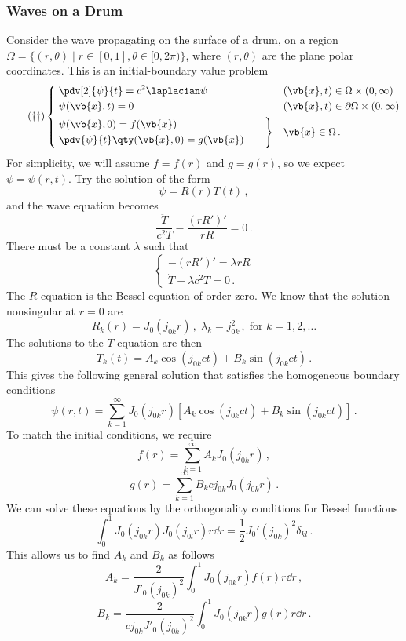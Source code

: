 \documentclass{article}
\theoremstyle{plain}\theoremheaderfont{\normalfont\itshape}\theorembodyfont{\rmfamily}\theoremseparator{.}\newtheorem*{rem}{Remark}\newtheorem*{ex}{Example}\newtheorem*{proof}{Proof}\newtheorem*{altp}{Alternative proof}
\theoremstyle{plain}\theoremheaderfont{\normalfont\bfseries}\theorembodyfont{\rmfamily}\theoremseparator{.}\newtheorem{thm}{Theorem}[section]\newtheorem{lem}[thm]{Lemma}\newtheorem{prop}[thm]{Proposition}\newtheorem*{cor}{Corollary}\newtheorem{defn}[thm]{Definition}\newtheorem{clm}[thm]{Claim}\newtheorem{clminproof}{Claim}
\theoremstyle{break}\theoremheaderfont{\normalfont\itshape}\theorembodyfont{\rmfamily}\theoremseparator{.\medskip}\newtheorem*{proofskip}{Proof}\newtheorem*{exs}{Examples}\newtheorem*{rems}{Remarks}
\theoremstyle{break}\theoremheaderfont{\normalfont\bfseries}\theorembodyfont{\rmfamily}\theoremseparator{.\medskip}\newtheorem{lemskip}[thm]{Lemma}\newtheorem{defnskip}[thm]{Definition}\newtheorem{propskip}[thm]{Proposition}\newtheorem{thmskip}[thm]{Theorem}
\numberwithin{equation}{section}
\begin{document}
	\subsubsection{Waves on a Drum}
	Consider the wave propagating on the surface of a drum, on a region \(\Omega=\{(r,\theta)\mid r\in[0,1],\theta\in[0,2\pi)\}\), where \((r,\theta)\) are the plane polar coordinates. This is an initial-boundary value problem
	\begin{equation}\tag{\(\dagger\dagger\)}
		\left\{\begin{aligned}
			& \;\pdv[2]{\psi}{t}=c^2\laplacian \psi && (\vb{x},t)\in\Omega\times(0,\infty)\\
			& \;\psi(\vb{x},t)=0 && (\vb{x},t)\in\partial\Omega\times(0,\infty)\\
			& \left.\begin{aligned}
				& \psi(\vb{x},0)=f(\vb{x})\\
				& \pdv{\psi}{t}\qty(\vb{x},0)=g(\vb{x})
			\end{aligned}\qquad\right\} && \vb{x}\in\Omega\,.
		\end{aligned}\right.
	\end{equation}
	For simplicity, we will assume \(f=f(r)\) and \(g=g(r)\), so we expect \(\psi=\psi(r,t)\). Try the solution of the form
	\[\psi=R(r)T(t)\,,\]
	and the wave equation becomes
	\[\frac{\ddot{T}}{c^2T}-\frac{(rR')'}{rR}=0\,.\]
	There must be a constant \(\lambda\) such that
	\[\begin{cases}
		-(rR')'=\lambda rR\\
		\ddot{T}+\lambda c^2T=0\,.
	\end{cases}\]
	The \(R\) equation is the Bessel equation of order zero. We know that the solution nonsingular at \(r=0\) are
	\[R_k(r)=J_0(j_{0k}r)\,,\;\lambda_k=j_{0k}^2\,,\;\text{for }k=1,2,\dots\]
	The solutions to the \(T\) equation are then
	\[T_k(t)=A_k\cos(j_{0k}ct)+B_k\sin(j_{0k}ct)\,.\]
	This gives the following general solution that satisfies the homogeneous boundary conditions
	\[\psi(r,t)=\sum_{k=1}^{\infty}J_0(j_{0k}r)[A_k\cos(j_{0k}ct)+B_k\sin(j_{0k}ct)]\,.\]
	To match the initial conditions, we require
	\[f(r)=\sum_{k=1}^{\infty}A_kJ_0(j_{0k}r)\,,\]
	\[g(r)=\sum_{k=1}^{\infty}B_kcj_{0k}J_0(j_{0k}r)\,.\]
	We can solve these equations by the orthogonality conditions for Bessel functions
	\[\int_{0}^{1}J_0(j_{0k}r)J_0(j_{0l}r)r\dd{r}=\frac{1}{2}J_0'(j_{0k})^2\delta_{kl}\,.\]
	This allows us to find \(A_k\) and \(B_k\) as follows
	\[A_k=\frac{2}{J'_0(j_{0k})^2}\int_{0}^{1}J_0(j_{0k}r)f(r)r\dd{r}\,,\]
	\[B_k=\frac{2}{cj_{0k}J'_0(j_{0k})^2}\int_{0}^{1}J_0(j_{0k}r)g(r)r\dd{r}\,.\]
\end{document}
